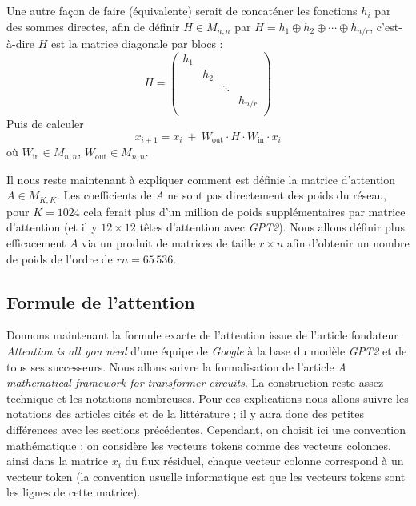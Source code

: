 \documentclass[11pt,class=report,crop=false]{standalone}
\begin{document}

Une autre façon de faire (équivalente) serait de concaténer les fonctions $h_i$ par des sommes directes, afin de définir $H \in M_{n,n}$ par 
$H = h_1 \oplus h_2 \oplus \cdots \oplus h_{n/r}$, c'est-à-dire $H$ est la matrice diagonale par blocs :
$$H = \begin{pmatrix}
	h_1 & && \\ 
	& h_2 & &  \\
	& & \ddots &  \\
	& & & h_{n/r} \\ 			
\end{pmatrix}$$
Puis de calculer 
$$x_{i+1} = x_i \ + \ W_{\text{out}}\cdot H \cdot W_{\text{in}} \cdot x_i$$
où $W_{\text{in}} \in M_{n,n}$, $W_{\text{out}} \in M_{n,n}$.
	

Il nous reste maintenant à expliquer comment est définie la matrice d'attention $A \in M_{K,K}$.
Les coefficients de $A$ ne sont pas directement des poids du réseau, pour $K = 1024$ cela ferait plus d'un million de poids supplémentaires par matrice d'attention (et il y $12 \times 12$ têtes d'attention avec \emph{GPT2}). Nous allons définir plus efficacement $A$ via un produit de matrices de taille $r\times n$ afin d'obtenir un nombre de poids de l'ordre de $rn = 65\,536$.


\subsection{Formule de l'attention}

Donnons maintenant la formule exacte de l'attention issue de l'article fondateur \emph{Attention is all you need} d'une équipe de \emph{Google} à la base du modèle \emph{GPT2} et de tous ses successeurs.
Nous allons suivre la formalisation de l'article \emph{A mathematical framework for transformer circuits}. La construction reste assez technique et les notations nombreuses.
Pour ces explications nous allons suivre les notations des articles cités et de la littérature ; il y aura donc des petites différences avec les sections précédentes. Cependant, on choisit ici une convention mathématique : on considère les vecteurs tokens comme des vecteurs colonnes, ainsi dans la matrice $x_i$ du flux résiduel, chaque vecteur colonne correspond à un vecteur token (la convention usuelle informatique est que les vecteurs tokens sont les lignes de cette matrice).
\end{document}
